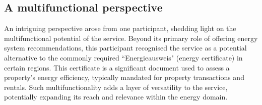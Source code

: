 \subsection*{A multifunctional perspective}

An intriguing perspective arose from one participant, shedding light on the multifunctional potential of the service. 
Beyond its primary role of offering energy system recommendations, this participant recognised the service as a potential alternative to the commonly required  ``Energieausweis" (energy certificate) \cite{verbraucherzentrale} in certain regions. 
This certificate is a significant document used to assess a property's energy efficiency, typically mandated for property transactions and rentals.
Such multifunctionality adds a layer of versatility to the service, potentially expanding its reach and relevance within the energy domain.